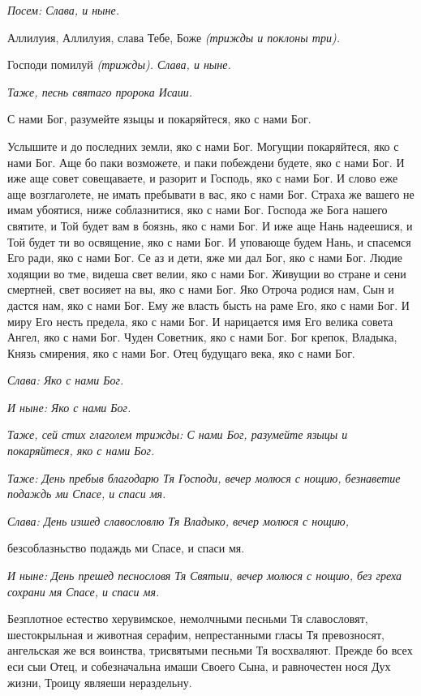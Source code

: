  \itshape Посем:\normalfont{} \itshape Слава, и ныне\normalfont{}.


   Аллилуия, Аллилуия, слава Тебе, Боже \itshape (трижды и поклоны три)\normalfont{}.


   Господи помилуй \itshape (трижды)\normalfont{}. \itshape Слава, и ныне\normalfont{}.


 \itshape Таже, песнь святаго пророка Исаии.\normalfont{}


   С нами Бог, разумейте языцы и покаряйтеся, яко с нами Бог.


   Услышите и до последних земли, яко с нами Бог. Могущии покаряйтеся,
яко с нами Бог. Аще бо паки возможете, и паки побеждени будете,
яко с нами Бог. И иже аще совет совещаваете, и разорит и Господь,
яко с нами Бог. И слово еже аще возглаголете, не имать пребывати
в вас, яко с нами Бог. Страха же вашего не имам убоятися, ниже
соблазнитися, яко с нами Бог. Господа же Бога нашего святите, и Той будет
вам в боязнь, яко с нами Бог. И иже аще Нань надеешися, и Той
будет ти во освящение, яко с нами Бог. И уповающе будем Нань, и
спасемся Его ради, яко с нами Бог. Се аз и дети, яже ми дал Бог, яко с
нами Бог. Людие ходящии во тме, видеша свет велии, яко с нами Бог.
Живущии во стране и сени смертней, свет восияет на вы, яко с нами Бог.
Яко Отроча родися нам, Сын и дастся нам, яко с нами Бог. Ему же
власть бысть на раме Его, яко с нами Бог. И миру Его несть предела,
яко с нами Бог. И нарицается имя Его велика совета Ангел, яко с
нами Бог. Чуден Советник, яко с нами Бог. Бог крепок, Владыка,
Князь смирения, яко с нами Бог. Отец будущаго века, яко с нами
Бог.


 \itshape Слава:\normalfont{} Яко с нами Бог.


 \itshape И ныне:\normalfont{} Яко с нами Бог.


 \itshape Таже, сей стих глаголем трижды:\normalfont{} С нами Бог, разумейте языцы и
покаряйтеся, яко с нами Бог.


 \itshape Таже:\normalfont{} День пребыв благодарю Тя Господи, вечер молюся с нощию,
безнаветие подаждь ми Спасе, и спаси мя.


 \itshape Слава:\normalfont{} День изшед славословлю Тя Владыко, вечер молюся с нощию,

безсоблазньство подаждь ми Спасе, и спаси мя.


 \itshape И ныне:\normalfont{} День прешед песнословя Тя Святыи, вечер молюся с нощию, без
греха сохрани мя Спасе, и спаси мя.


   Безплотное естество херувимское, немолчными песньми Тя славословят,
шестокрыльная и животная серафим, непрестанными гласы Тя превозносят,
ангельская же вся воинства, трисвятыми песньми Тя восхваляют. Прежде бо
всех еси сыи Отец, и собезначальна имаши Своего Сына, и равночестен нося
Дух жизни, Троицу являеши нераздельну.


